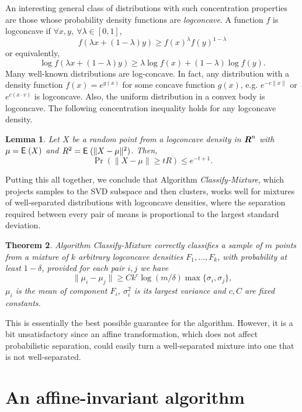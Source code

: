 \documentclass{book}
\newtheorem{theorem}{Theorem}[chapter]
\newtheorem{lemma}[theorem]{Lemma}
\numberwithin{exercise}{chapter}
\begin{document}
An interesting general class of distributions with such concentration properties are those whose probability density functions are {\em logconcave}. A function $f$ is logconcave if $\forall x,y,~\forall \lambda\in [0,1]$,
\[f(\lambda x + (1-\lambda) y)\ge f(x)^{\lambda} f(y)^{1-\lambda}\]
or equivalently,
\[\log f(\lambda x + (1-\lambda) y)\ge \lambda \log f(x) + (1-\lambda)\log f(y).\]
Many well-known distributions are log-concave.
In fact, any distribution with a density function $f(x)=e^{g(x)}$ for some concave function $g(x)$, e.g. $e^{-c\|x\|}$ or $e^{c(x\cdot v)}$ is logconcave. Also, the uniform distribution in a convex body is logconcave. The following concentration inequality \cite{Lovasz2007} holds for any logconcave density.

\begin{lemma}\label{logcon-conc}
Let $X$ be a random point from a logconcave density in $\mbox{\mbox{\boldmath $R$}}^n$ with $\mu = \hbox{{\sf E}\;}(X)$ and $R^2 = \hbox{{\sf E}\;}(\|X-\mu\|^2)$. Then,
\[
\Pr(\|X-\mu\| \ge tR) \le e^{-t+1}.
\]
\end{lemma}

Putting this all together, we conclude that Algorithm {\em Classify-Mixture}, which projects samples to the SVD subspace and then clusters, works well for mixtures of well-separated distributions with logconcave densities, where the separation required between every pair of means is proportional to the largest standard deviation.

\begin{theorem}
Algorithm {\em Classify-Mixture} correctly classifies a sample of $m$ points from a mixture of $k$ arbitrary logconcave densities $F_1, \ldots, F_k$, with probability at least $1-\delta$, provided for each pair $i,j$ we have
\[
\|\mu_i-\mu_j\| \ge C k^c\log(m/\delta) \max\{\sigma_i, \sigma_j\},
\]
$\mu_i$ is the mean of component $F_i$, $\sigma_i^2$ is its largest variance and $c,C$ are fixed constants.
\end{theorem}

This is essentially the best possible guarantee for the algorithm. However, it is a bit unsatisfactory since an affine transformation, which does not affect probabilistic separation, could easily turn a well-separated mixture into one that is not well-separated.

\section{An affine-invariant algorithm}
\end{document}
